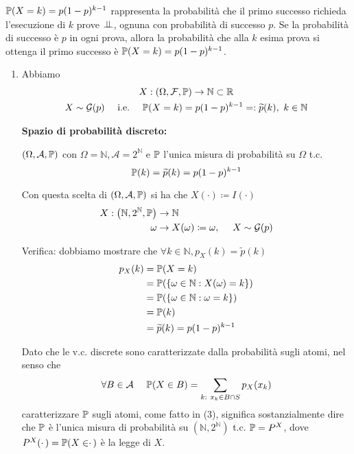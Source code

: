 \Soluzione
\begin{oss}
$\mathbb{P}( X=k) =p( 1-p)^{k-1}$ rappresenta la probabilità che il primo successo richieda l'esecuzione di $k$ prove $\perp \!\!\! \perp $, ognuna con probabilità di successo $p$. Se la probabilità di successo è $p$ in ogni prova, allora la probabilità che alla $k$ esima prova si ottenga il primo successo è $\mathbb{P}( X=k) =p( 1-p)^{k-1}$.
\end{oss}
\begin{enumerate}
\item Abbiamo
\begin{gather*}
X:( \Omega ,\mathcal{F} ,\mathbb{P})\rightarrow \mathbb{N} \subset \mathbb{R}\\
X\sim \mathcal{G}( p) \ \ \ \ \text{i.e.} \ \ \ \ \mathbb{P}( X=k) =p( 1-p)^{k-1} =:\widetilde{p}( k) ,\ k\in \mathbb{N}
\end{gather*}

\textbf{Spazio di probabilità discreto:}

$( \Omega ,\mathcal{A} ,\mathbb{P})$ con $\Omega =\mathbb{N} ,\mathcal{A} =2^{\mathbb{N}}$ e $\mathbb{P}$ l'unica misura di probabilità su $\Omega $ t.c.\begin{equation}
\mathbb{P}( k) =\widetilde{p}( k) =p( 1-p)^{k-1}
\end{equation}

Con questa scelta di $( \Omega ,\mathcal{A} ,\mathbb{P})$ si ha che $X( \cdotp ) \coloneqq I( \cdotp )$\begin{align*}
X:\left(\mathbb{N} ,2^{\mathbb{N}} ,\mathbb{P}\right) & \rightarrow \mathbb{N}\\
\omega  & \rightarrow X( \omega ) \coloneqq \omega ,\ \ \ \ X\sim \mathcal{G}( p)
\end{align*}

Verifica: dobbiamo mostrare che $\forall k\in \mathbb{N} ,p_{X}( k) =\tilde{p}( k)$\begin{align*}
p_{X}( k) & =\mathbb{P}( X=k)\\
 & =\mathbb{P}(\{\omega \in \mathbb{N} :X( \omega ) =k\})\\
 & =\mathbb{P}(\{\omega \in \mathbb{N} :\omega =k\})\\
 & =\mathbb{P}( k)\\
 & =\widetilde{p}( k) =p( 1-p)^{k-1}
\end{align*}

\begin{oss}
Dato che le v.c. discrete sono caratterizzate dalla probabilità sugli atomi, nel senso che
\begin{equation*}
\forall B\in \mathcal{A} \ \ \ \ \mathbb{P}( X\in B) =\sum\limits _{k:\ x_{k} \in B\cap S} p_{X}( x_{k})
\end{equation*}
caratterizzare $\mathbb{P}$ sugli atomi, come fatto in (3), significa sostanzialmente dire che $\mathbb{P}$ è l'unica misura di probabilità su $\left(\mathbb{N} ,2^{\mathbb{N}}\right)$ t.c. $\mathbb{P} =P^{X}$, dove $P^{X}( \cdotp ) =\mathbb{P}( X\in \cdotp )$ è la legge di $X$.


\end{oss}
\end{enumerate}
